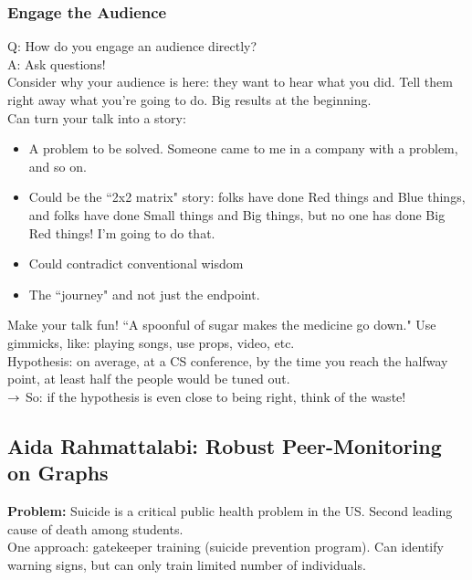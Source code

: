 \subsubsection{Engage the Audience}

Q: How do you engage an audience directly? \\

A: Ask questions! \\

Consider why your audience is here: they want to hear what you did. Tell them right away what you're going to do. Big results at the beginning. \\

Can turn your talk into a story:
\begin{itemize}
    \item A problem to be solved. Someone came to me in a company with a problem, and so on.
    \item Could be the ``2x2 matrix" story: folks have done Red things and Blue things, and folks have done Small things and Big things, but no one has done Big Red things! I'm going to do that.
    \item Could contradict conventional wisdom
    \item The ``journey" and not just the endpoint.
\end{itemize}

Make your talk fun! ``A spoonful of sugar makes the medicine go down." Use gimmicks, like: playing songs, use props, video, etc. \\

Hypothesis: on average, at a CS conference, by the time you reach the halfway point, at least half the people would be tuned out. \\

$\rightarrow$ So: if the hypothesis is even close to being right, think of the waste! \\

\subsection{Aida Rahmattalabi: Robust Peer-Monitoring on Graphs}

{\bf Problem:} Suicide is a critical public health problem in the US. Second leading cause of death among students. \\

One approach: gatekeeper training (suicide prevention program). Can identify warning signs, but can only train limited number of individuals. \\

